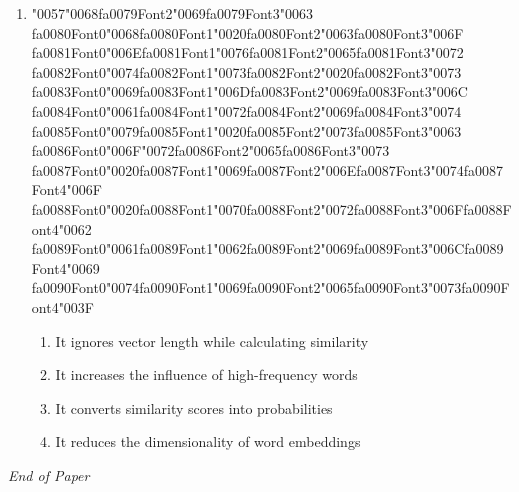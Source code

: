 \documentclass[12pt]{article}
\begin{document}
\begin{enumerate}[label=Q\arabic*.]
\begin{enumerate}[label=(\Alph*)]
    \item Increase the weight of very common words
    \item Represent word order
    \item Convert sparse vectors into dense embeddings
    \item Highlight words that are frequent in a document but rare across documents
\end{enumerate}
\item {\char"0057}{\char"0068}{\csname fa0079Font2\endcsname\char"0069}{\csname fa0079Font3\endcsname\char"0063} {\csname fa0080Font0\endcsname\char"0068}{\csname fa0080Font1\endcsname\char"0020}{\csname fa0080Font2\endcsname\char"0063}{\csname fa0080Font3\endcsname\char"006F} {\csname fa0081Font0\endcsname\char"006E}{\csname fa0081Font1\endcsname\char"0076}{\csname fa0081Font2\endcsname\char"0065}{\csname fa0081Font3\endcsname\char"0072} {\csname fa0082Font0\endcsname\char"0074}{\csname fa0082Font1\endcsname\char"0073}{\csname fa0082Font2\endcsname\char"0020}{\csname fa0082Font3\endcsname\char"0073} {\csname fa0083Font0\endcsname\char"0069}{\csname fa0083Font1\endcsname\char"006D}{\csname fa0083Font2\endcsname\char"0069}{\csname fa0083Font3\endcsname\char"006C} {\csname fa0084Font0\endcsname\char"0061}{\csname fa0084Font1\endcsname\char"0072}{\csname fa0084Font2\endcsname\char"0069}{\csname fa0084Font3\endcsname\char"0074} {\csname fa0085Font0\endcsname\char"0079}{\csname fa0085Font1\endcsname\char"0020}{\csname fa0085Font2\endcsname\char"0073}{\csname fa0085Font3\endcsname\char"0063} {\csname fa0086Font0\endcsname\char"006F}{\char"0072}{\csname fa0086Font2\endcsname\char"0065}{\csname fa0086Font3\endcsname\char"0073} {\csname fa0087Font0\endcsname\char"0020}{\csname fa0087Font1\endcsname\char"0069}{\csname fa0087Font2\endcsname\char"006E}{\csname fa0087Font3\endcsname\char"0074}{\csname fa0087Font4\endcsname\char"006F} {\csname fa0088Font0\endcsname\char"0020}{\csname fa0088Font1\endcsname\char"0070}{\csname fa0088Font2\endcsname\char"0072}{\csname fa0088Font3\endcsname\char"006F}{\csname fa0088Font4\endcsname\char"0062} {\csname fa0089Font0\endcsname\char"0061}{\csname fa0089Font1\endcsname\char"0062}{\csname fa0089Font2\endcsname\char"0069}{\csname fa0089Font3\endcsname\char"006C}{\csname fa0089Font4\endcsname\char"0069} {\csname fa0090Font0\endcsname\char"0074}{\csname fa0090Font1\endcsname\char"0069}{\csname fa0090Font2\endcsname\char"0065}{\csname fa0090Font3\endcsname\char"0073}{\csname fa0090Font4\endcsname\char"003F}
\begin{enumerate}[label=(\Alph*)]
    \item It ignores vector length while calculating similarity
    \item It increases the influence of high-frequency words
    \item It converts similarity scores into probabilities
    \item It reduces the dimensionality of word embeddings
\end{enumerate}
\end{enumerate}

\vfill
\noindent\textit{End of Paper}
\end{document}
